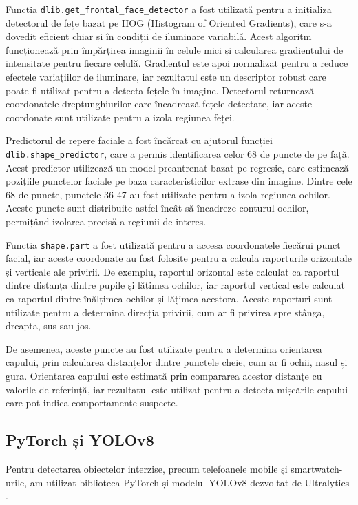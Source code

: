 \documentclass[12pt,a4paper]{article}
\begin{document}
Funcția \texttt{dlib.get\_frontal\_face\_detector} a fost utilizată pentru a inițializa detectorul de fețe bazat pe HOG (Histogram of Oriented Gradients), care s-a dovedit eficient chiar și în condiții de iluminare variabilă. Acest algoritm funcționează prin împărțirea imaginii în celule mici și calcularea gradientului de intensitate pentru fiecare celulă. Gradientul este apoi normalizat pentru a reduce efectele variațiilor de iluminare, iar rezultatul este un descriptor robust care poate fi utilizat pentru a detecta fețele în imagine. Detectorul returnează coordonatele dreptunghiurilor care încadrează fețele detectate, iar aceste coordonate sunt utilizate pentru a izola regiunea feței.

Predictorul de repere faciale a fost încărcat cu ajutorul funcției \texttt{dlib.shape\_predictor}, care a permis identificarea celor 68 de puncte de pe față. Acest predictor utilizează un model preantrenat bazat pe regresie, care estimează pozițiile punctelor faciale pe baza caracteristicilor extrase din imagine. Dintre cele 68 de puncte, punctele 36-47 au fost utilizate pentru a izola regiunea ochilor. Aceste puncte sunt distribuite astfel încât să încadreze conturul ochilor, permițând izolarea precisă a regiunii de interes.

Funcția \texttt{shape.part} a fost utilizată pentru a accesa coordonatele fiecărui punct facial, iar aceste coordonate au fost folosite pentru a calcula raporturile orizontale și verticale ale privirii. De exemplu, raportul orizontal este calculat ca raportul dintre distanța dintre pupile și lățimea ochilor, iar raportul vertical este calculat ca raportul dintre înălțimea ochilor și lățimea acestora. Aceste raporturi sunt utilizate pentru a determina direcția privirii, cum ar fi privirea spre stânga, dreapta, sus sau jos.

De asemenea, aceste puncte au fost utilizate pentru a determina orientarea capului, prin calcularea distanțelor dintre punctele cheie, cum ar fi ochii, nasul și gura. Orientarea capului este estimată prin compararea acestor distanțe cu valorile de referință, iar rezultatul este utilizat pentru a detecta mișcările capului care pot indica comportamente suspecte.

\subsection{PyTorch și YOLOv8}
\hspace{6mm}Pentru detectarea obiectelor interzise, precum telefoanele mobile și smartwatch-urile, am utilizat biblioteca PyTorch \cite{pytorch} și modelul YOLOv8 dezvoltat de Ultralytics \cite{ultralytics}. 
\end{document}
